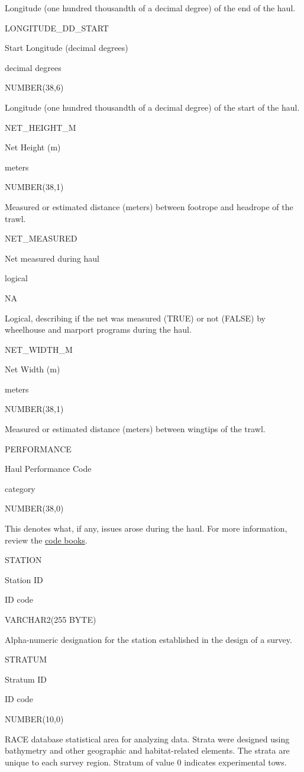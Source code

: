 \documentclass[
  letterpaper,
  oneside,
  open=any]{scrbook}
\begin{document}
Longitude (one hundred thousandth of a decimal degree) of the end of the
haul.

LONGITUDE\_DD\_START

Start Longitude (decimal degrees)

decimal degrees

NUMBER(38,6)

Longitude (one hundred thousandth of a decimal degree) of the start of
the haul.

NET\_HEIGHT\_M

Net Height (m)

meters

NUMBER(38,1)

Measured or estimated distance (meters) between footrope and headrope of
the trawl.

NET\_MEASURED

Net measured during haul

logical

NA

Logical, describing if the net was measured (TRUE) or not (FALSE) by
wheelhouse and marport programs during the haul.

NET\_WIDTH\_M

Net Width (m)

meters

NUMBER(38,1)

Measured or estimated distance (meters) between wingtips of the trawl.

PERFORMANCE

Haul Performance Code

category

NUMBER(38,0)

This denotes what, if any, issues arose during the haul. For more
information, review the
\href{https://www.fisheries.noaa.gov/resource/document/groundfish-survey-species-code-manual-and-data-codes-manual}{code
books}.

STATION

Station ID

ID code

VARCHAR2(255 BYTE)

Alpha-numeric designation for the station established in the design of a
survey.

STRATUM

Stratum ID

ID code

NUMBER(10,0)

RACE database statistical area for analyzing data. Strata were designed
using bathymetry and other geographic and habitat-related elements. The
strata are unique to each survey region. Stratum of value 0 indicates
experimental tows.
\end{document}
